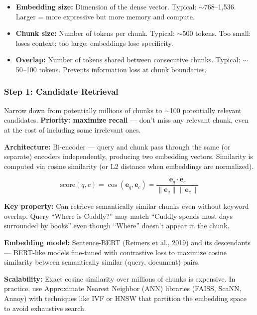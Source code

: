 \documentclass[11pt, a4paper]{article}
\begin{document}
\begin{defbox}
\begin{itemize}[leftmargin=1.5em]
  \item \textbf{Embedding size:} Dimension of the dense vector. Typical: $\sim$768--1,536. Larger = more expressive but more memory and compute.
  \item \textbf{Chunk size:} Number of tokens per chunk. Typical: $\sim$500 tokens. Too small: loses context; too large: embeddings lose specificity.
  \item \textbf{Overlap:} Number of tokens shared between consecutive chunks. Typical: $\sim$50--100 tokens. Prevents information loss at chunk boundaries.
\end{itemize}
\end{defbox}

\subsubsection{Step 1: Candidate Retrieval}

\begin{defbox}
Narrow down from potentially millions of chunks to $\sim$100 potentially relevant candidates. \textbf{Priority: maximize recall} --- don't miss any relevant chunk, even at the cost of including some irrelevant ones.
\end{defbox}

\begin{defbox}
\textbf{Architecture:} Bi-encoder --- query and chunk pass through the same (or separate) encoders independently, producing two embedding vectors. Similarity is computed via cosine similarity (or L2 distance when embeddings are normalized).

\[
\text{score}(q, c) = \cos(\mathbf{e}_q, \mathbf{e}_c) = \frac{\mathbf{e}_q \cdot \mathbf{e}_c}{\|\mathbf{e}_q\| \|\mathbf{e}_c\|}
\]

\textbf{Key property:} Can retrieve semantically similar chunks even without keyword overlap. Query ``Where is Cuddly?'' may match ``Cuddly spends most days surrounded by books'' even though ``Where'' doesn't appear in the chunk.

\textbf{Embedding model:} Sentence-BERT (Reimers et al., 2019) and its descendants --- BERT-like models fine-tuned with contrastive loss to maximize cosine similarity between semantically similar (query, document) pairs.

\textbf{Scalability:} Exact cosine similarity over millions of chunks is expensive. In practice, use Approximate Nearest Neighbor (ANN) libraries (FAISS, ScaNN, Annoy) with techniques like IVF or HNSW that partition the embedding space to avoid exhaustive search.
\end{defbox}
\end{document}
